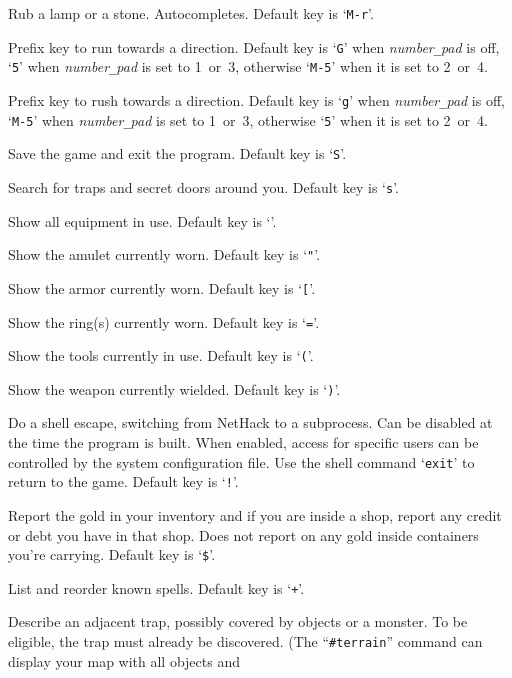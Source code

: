 Rub a lamp or a stone. Autocompletes. Default key is `{\tt M-r}'.
\item[\tb{\#run}]
Prefix key to run towards a direction.
Default key is `{\tt G}' when
{\it number\verb+_+pad\/}
is off,
`{\tt 5}' when
{\it number\verb+_+pad\/}
is set to 1~or~3,
otherwise `{\tt M-5}' when it is set to 2~or~4.
\item[\tb{\#rush}]
Prefix key to rush towards a direction.
Default key is `{\tt g}' when
{\it number\verb+_+pad\/}
is off,
`{\tt M-5}' when
{\it number\verb+_+pad\/}
is set to 1~or~3,
otherwise `{\tt 5}' when it is set to 2~or~4.
\item[\tb{\#save}]
Save the game and exit the program.
Default key is `{\tt S}'.
\item[\tb{\#search}]
Search for traps and secret doors around you. Default key is `{\tt s}'.
\item[\tb{\#seeall}]
Show all equipment in use. Default key is `{\tt *}'.
\item[\tb{\#seeamulet}]
Show the amulet currently worn. Default key is `{\tt "}'.
\item[\tb{\#seearmor}]
Show the armor currently worn. Default key is `{\tt [}'.
\item[\tb{\#seerings}]
Show the ring(s) currently worn. Default key is `{\tt =}'.
\item[\tb{\#seetools}]
Show the tools currently in use. Default key is `{\tt (}'.
\item[\tb{\#seeweapon}]
Show the weapon currently wielded. Default key is `{\tt )}'.
\item[\tb{\#shell}]
Do a shell escape, switching from NetHack to a subprocess.
Can be disabled at the time the program is built.
When enabled, access for specific users can be controlled by the system
configuration file.
Use the shell command `{\tt exit}' to return to the game.
Default key is `{\tt !}'.
\item[\tb{\#showgold}]
Report the gold in your inventory and if you are inside a shop,
report any credit or debt you have in that shop.
Does not report on any gold inside containers you're carrying.
Default key is `{\tt \$}'.
\item[\tb{\#showspells}]
List and reorder known spells.
Default key is `{\tt +}'.
\item[\tb{\#showtrap}]
Describe an adjacent trap, possibly covered by objects or a monster.
To be eligible, the trap must already be discovered.
(The ``{\tt \#terrain}'' command can display your map with all objects and
